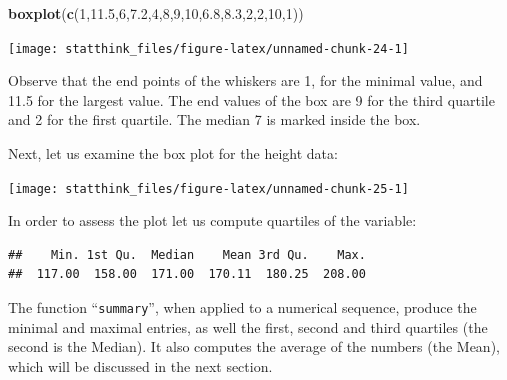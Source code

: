 \documentclass[]{krantz}
\makeatletter
\newenvironment{Shaded}{\begin{snugshade}}{\end{snugshade}}
\newcommand{\KeywordTok}[1]{\textcolor[rgb]{0.13,0.29,0.53}{\textbf{#1}}}
\newcommand{\DecValTok}[1]{\textcolor[rgb]{0.00,0.00,0.81}{#1}}
\newcommand{\FloatTok}[1]{\textcolor[rgb]{0.00,0.00,0.81}{#1}}
\newcommand{\OperatorTok}[1]{\textcolor[rgb]{0.81,0.36,0.00}{\textbf{#1}}}
\newcommand{\NormalTok}[1]{#1}
\newenvironment{kframe}{%
\medskip{}
\setlength{\fboxsep}{.8em}
 \def\at@end@of@kframe{}%
 \ifinner\ifhmode%
  \def\at@end@of@kframe{\end{minipage}}%
  \begin{minipage}{\columnwidth}%
 \fi\fi%
 \def\FrameCommand##1{\hskip\@totalleftmargin \hskip-\fboxsep
 \colorbox{shadecolor}{##1}\hskip-\fboxsep
     \hskip-\linewidth \hskip-\@totalleftmargin \hskip\columnwidth}%
 \MakeFramed {\advance\hsize-\width
   \@totalleftmargin\z@ \linewidth\hsize
   \@setminipage}}%
 {\par\unskip\endMakeFramed%
 \at@end@of@kframe}
\renewenvironment{Shaded}{\begin{kframe}}{\end{kframe}}
\theoremstyle{definition}
\theoremstyle{definition}
\theoremstyle{definition}
\theoremstyle{remark}
\makeatother
\begin{document}
\begin{Shaded}
\begin{Highlighting}[]
\KeywordTok{boxplot}\NormalTok{(}\KeywordTok{c}\NormalTok{(}\DecValTok{1}\NormalTok{,}\FloatTok{11.5}\NormalTok{,}\DecValTok{6}\NormalTok{,}\FloatTok{7.2}\NormalTok{,}\DecValTok{4}\NormalTok{,}\DecValTok{8}\NormalTok{,}\DecValTok{9}\NormalTok{,}\DecValTok{10}\NormalTok{,}\FloatTok{6.8}\NormalTok{,}\FloatTok{8.3}\NormalTok{,}\DecValTok{2}\NormalTok{,}\DecValTok{2}\NormalTok{,}\DecValTok{10}\NormalTok{,}\DecValTok{1}\NormalTok{))}
\end{Highlighting}
\end{Shaded}

\begin{center}\texttt{[image: statthink\_files/figure-latex/unnamed-chunk-24-1]} \end{center}

Observe that the end points of the whiskers are 1, for the minimal
value, and 11.5 for the largest value. The end values of the box are 9
for the third quartile and 2 for the first quartile. The median 7 is
marked inside the box.

Next, let us examine the box plot for the height data:

\begin{Shaded}
\end{Shaded}

\begin{center}\texttt{[image: statthink\_files/figure-latex/unnamed-chunk-25-1]} \end{center}

In order to assess the plot let us compute quartiles of the variable:

\begin{Shaded}
\end{Shaded}

\begin{verbatim}
##    Min. 1st Qu.  Median    Mean 3rd Qu.    Max. 
##  117.00  158.00  171.00  170.11  180.25  208.00
\end{verbatim}

The function ``\texttt{summary}'', when applied to a numerical sequence,
produce the minimal and maximal entries, as well the first, second and
third quartiles (the second is the Median). It also computes the average
of the numbers (the Mean), which will be discussed in the next section.
\end{document}

